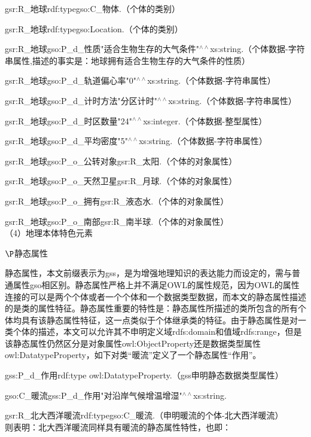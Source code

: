 gsr:R\_地球\quad rdf:type\quad gso:C\_物体\quad .（个体的类别）

gsr:R\_地球\quad rdf:type\quad gso:Location\quad .（个体的类别）

gsr:R\_地球\quad gso:P\_d\_性质\quad "适合生物生存的大气条件"$^{\land\land}$xs:string\quad .（个体数据-字符串属性,描述的事实是：地球拥有适合生物生存的大气条件的性质）

gsr:R\_地球\quad gso:P\_d\_轨道偏心率\quad "0"$^{\land\land}$xs:string\quad .（个体数据-字符串属性）

gsr:R\_地球\quad gso:P\_d\_计时方法\quad "分区计时"$^{\land\land}$xs:string\quad .（个体数据-字符串属性）

gsr:R\_地球\quad gso:P\_d\_时区数量\quad "24"$^{\land\land}$xs:integer\quad .（个体数据-整型属性）

gsr:R\_地球\quad gso:P\_d\_平均密度\quad "5"$^{\land\land}$xs:string\quad .（个体数据-字符串属性）

gsr:R\_地球\quad gso:P\_o\_公转对象\quad gsr:R\_太阳\quad .（个体的对象属性）

gsr:R\_地球\quad gso:P\_o\_天然卫星\quad gsr:R\_月球\quad .（个体的对象属性）

gsr:R\_地球\quad gso:P\_o\_拥有\quad gsr:R\_液态水\quad .（个体的对象属性）

gsr:R\_地球\quad gso:P\_o\_南部\quad gsr:R\_南半球\quad .（个体的对象属性）
\\

（4）地理本体特色元素

$\P$静态属性
		
静态属性，本文前缀表示为gss，是为增强地理知识的表达能力而设定的，需与普通属性gso相区别。静态属性严格上并不满足OWL的属性规范，因为OWL的属性连接的可以是两个个体或者一个个体和一个数据类型数据，而本文的静态属性描述的是类的属性特征。静态属性重要的特性是：静态属性所描述的类所包含的所有个体均具有该静态属性特征，这一点类似于个体继承类的特征。由于静态属性是对一类个体的描述，本文可以允许其不申明定义域rdfs:domain和值域rdfs:range，但是该静态属性仍然区分是对象属性owl:ObjectProperty还是数据类型属性owl:DatatypeProperty，如下对类“暖流”定义了一个静态属性“作用”。

gss:P\_d\_作用\quad rdf:type \quad owl:DatatypeProperty\quad .（gss申明静态数据类型属性）

gso:C\_暖流\quad gss:P\_d\_作用\quad "对沿岸气候增温增湿"$^{\land\land}$xs:string\quad .

gsr:R\_北大西洋暖流\quad rdf:type\quad gso:C\_暖流.（申明暖流的个体-北大西洋暖流）
\\
则表明：北大西洋暖流同样具有暖流的静态属性特性，也即：

